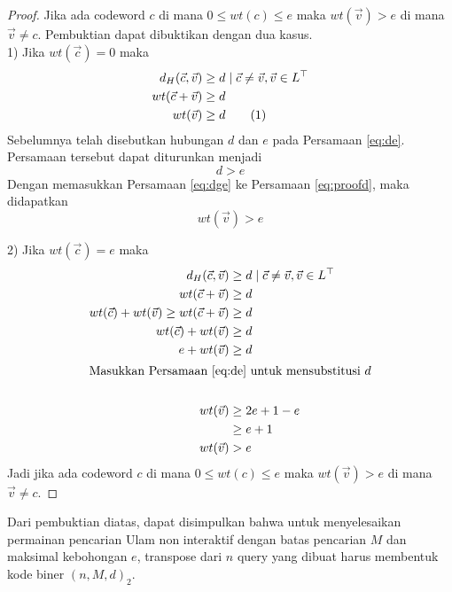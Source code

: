 \begin{proof}
Jika ada codeword $c$ di mana $0 \le wt(c) \le e$ maka $wt(\vec{v}) > e$ di mana $\vec{v} \neq c$. Pembuktian dapat dibuktikan dengan dua kasus.\\

1) Jika $wt(\vec{c}) = 0$ maka
\begin{align*}
d_H(\vec{c},\vec{v}) &\ge d \mid \vec{c} \neq \vec{v} , \vec{v} \in L^\top \\
wt(\vec{c} + \vec{v}) &\ge d \\
wt(\vec{v}) &\ge d \label{eq:proofd} \stepcounter{equation} \tag{\theequation}
\end{align*}
Sebelumnya telah disebutkan hubungan $d$ dan $e$ pada Persamaan \ref{eq:de}. Persamaan tersebut dapat diturunkan menjadi
\begin{equation} \label{eq:dge}
d > e
\end{equation}
Dengan memasukkan Persamaan \ref{eq:dge} ke Persamaan \ref{eq:proofd}, maka didapatkan
\begin{equation*}
wt(\vec{v}) > e
\end{equation*}

2) Jika $wt(\vec{c}) = e$ maka
\begin{align*}
d_H(\vec{c},\vec{v}) &\ge d \mid \vec{c} \neq \vec{v} , \vec{v} \in L^\top \\
wt(\vec{c}+\vec{v}) &\ge d \\
wt(\vec{c}) + wt(\vec{v}) \ge wt(\vec{c}+\vec{v}) &\ge d \\
wt(\vec{c}) + wt(\vec{v}) &\ge d \\
e + wt(\vec{v}) &\ge d \\
\intertext{Masukkan Persamaan \ref{eq:de} untuk mensubstitusi $d$}\\
wt(\vec{v}) &\ge 2e+1-e \\
&\ge e+1\\
wt(\vec{v}) &> e
\end{align*}
Jadi jika ada codeword $c$ di mana $0 \le wt(c) \le e$ maka $wt(\vec{v}) > e$ di mana $\vec{v} \neq c$.
\end{proof}

Dari pembuktian diatas, dapat disimpulkan bahwa untuk menyelesaikan permainan pencarian Ulam non interaktif dengan batas pencarian $M$ dan maksimal kebohongan $e$, transpose dari $n$ query yang dibuat harus membentuk kode biner $(n,M,d)_2$.
